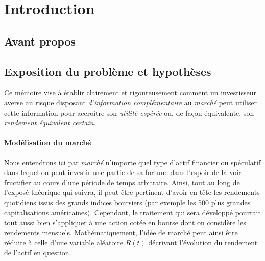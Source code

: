 \section{Introduction}


\subsection{Avant propos}



\subsection{Exposition du problème et hypothèses}

Ce mémoire vise à établir clairement et rigoureusement comment un investisseur
averse au risque disposant \textit{d'information complémentaire} au
\textit{marché} peut utiliser cette information pour accroître son \textit{utilité
  espérée} ou, de façon équivalente, son \textit{rendement équivalent certain}.

\paragraph{Modélisation du marché}

Nous entendrons ici par \textit{marché} n'importe quel type d'actif financier ou
spéculatif dans lequel on peut investir une partie de sa fortune dans l'espoir de la voir
fructifier au cours d'une période de temps arbitraire. Ainsi, tout au long de l'exposé
théorique qui suivra, il peut être pertinent d'avoir en tête les rendements quotidiens
issus des grands indices boursiers (par exemple les 500 plus grandes capitalisations
américaines). Cependant, le traitement qui sera développé pourrait tout aussi bien
s'appliquer à une action cotée en bourse dont on considère les rendements mensuels.\nec
Mathématiquement, l'idée de marché peut ainsi être réduite à celle d'une variable
aléatoire $R(t)$ décrivant l'évolution du rendement de l'actif en question.

